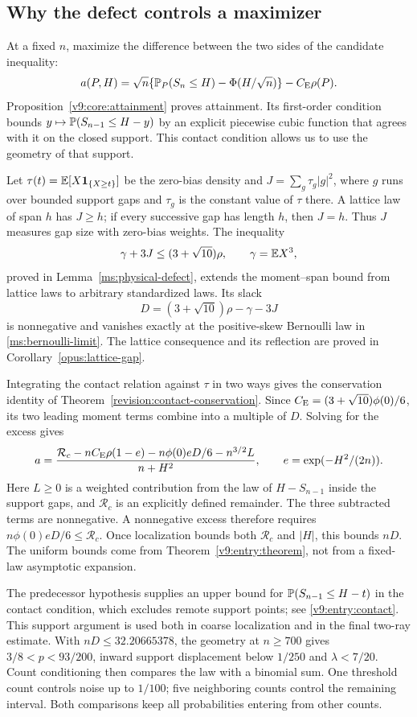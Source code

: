 \subsection{Why the defect controls a maximizer}
At a fixed $n$, maximize the difference between the two sides of the
candidate inequality:
\begin{equation}\label{v9:intro:excess}
 a(P,H)=\sqrt n\{\mathbb P_P(S_n\le H)-\Phi(H/\sqrt n)\}-C_{\mathrm E}\rho(P).
\end{equation}
Proposition~\ref{v9:core:attainment} proves attainment. Its first-order
condition bounds $y\mapsto\mathbb P(S_{n-1}\le H-y)$ by an explicit
piecewise cubic function that agrees with it on the closed support.
This contact condition allows us to use the geometry of that support.

Let $\tau(t)=\mathbb E[X\mathbf 1_{\{X\ge t\}}]$ be the zero-bias density and
$J=\sum_g\tau_g|g|^2$, where $g$ runs over bounded support gaps and
$\tau_g$ is the constant value of $\tau$ there. A lattice law of span
$h$ has $J\ge h$; if every successive gap has length $h$, then $J=h$.
Thus $J$ measures gap size with zero-bias weights. The inequality
\[
 \gamma+3J\le(3+\sqrt{10})\rho,\qquad \gamma=\mathbb E X^3,
\]
proved in Lemma~\ref{ms:physical-defect}, extends the moment--span
bound from lattice laws to arbitrary standardized laws. Its slack
\[
 D=(3+\sqrt{10})\rho-\gamma-3J
\]
is nonnegative and vanishes exactly at the positive-skew Bernoulli
law in \eqref{ms:bernoulli-limit}. The lattice consequence and its
reflection are proved in Corollary~\ref{opus:lattice-gap}.

Integrating the contact relation against $\tau$ in two ways gives the
conservation identity of Theorem~\ref{revision:contact-conservation}.
Since $C_{\mathrm E}=(3+\sqrt{10})\phi(0)/6$, its two leading moment terms
combine into a multiple of $D$. Solving for the excess gives
\[
 a=\frac{\mathcal R_c-nC_{\mathrm E}\rho(1-e)
             -n\phi(0)eD/6-n^{3/2}L}{n+H^2},
 \qquad e=\exp(-H^2/(2n)).
\]
Here $L\ge0$ is a weighted contribution from the law of $H-S_{n-1}$
inside the support gaps, and $\mathcal R_c$ is an explicitly defined
remainder. The three subtracted terms are nonnegative. A nonnegative
excess therefore requires $n\phi(0)eD/6\le\mathcal R_c$.
Once localization bounds both $\mathcal R_c$ and $|H|$, this bounds
$nD$. The uniform bounds come from Theorem~\ref{v9:entry:theorem},
not from a fixed-law asymptotic expansion.

The predecessor hypothesis supplies an upper bound for
$\mathbb P(S_{n-1}\le H-t)$ in the contact condition, which excludes remote
support points; see \eqref{v9:entry:contact}. This support argument is
used both in coarse localization and in the final two-ray estimate.
With $nD\le32.20665378$, the geometry at $n\ge700$ gives
$3/8<p<93/200$, inward support displacement below $1/250$ and
$\lambda<7/20$. Count conditioning then compares the law with a
binomial sum. One threshold count controls noise up to $1/100$;
five neighboring counts control the remaining interval. Both
comparisons keep all probabilities entering from other counts.

